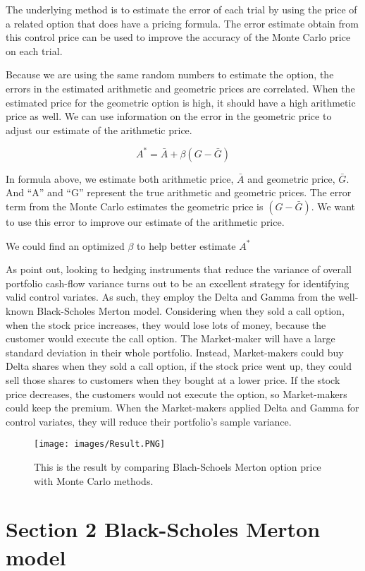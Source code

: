 \documentclass[11pt,]{article}
\makeatletter
\def\maxwidth{\ifdim\Gin@nat@width>\linewidth\linewidth
\else\Gin@nat@width\fi}
\let\Oldincludegraphics\includegraphics
\renewcommand{\includegraphics}[1]{\Oldincludegraphics[width=\maxwidth]{#1}}
\makeatother
\begin{document}
The underlying method is to estimate the error of each trial by using
the price of a related option that does have a pricing formula. The
error estimate obtain from this control price can be used to improve the
accuracy of the Monte Carlo price on each trial.

Because we are using the same random numbers to estimate the option, the
errors in the estimated arithmetic and geometric prices are correlated.
When the estimated price for the geometric option is high, it should
have a high arithmetic price as well. We can use information on the
error in the geometric price to adjust our estimate of the arithmetic
price.

\[
A^* = \bar A + \beta(G-\bar G)
\]

In formula above, we estimate both arithmetic price, \(\bar A\) and
geometric price, \(\bar G\). And ``A'' and ``G'' represent the true
arithmetic and geometric prices. The error term from the Monte Carlo
estimates the geometric price is \((G - \bar G)\). We want to use this
error to improve our estimate of the arithmetic price.

We could find an optimized \(\beta\) to help better estimate \(A^*\)

As \citet{ClewlowStrickland} point out, looking to hedging instruments
that reduce the variance of overall portfolio cash-flow variance turns
out to be an excellent strategy for identifying valid control variates.
As such, they employ the Delta and Gamma from the well-known
Black-Scholes Merton model. Considering when they sold a call option,
when the stock price increases, they would lose lots of money, because
the customer would execute the call option. The Market-maker will have a
large standard deviation in their whole portfolio. Instead,
Market-makers could buy Delta shares when they sold a call option, if
the stock price went up, they could sell those shares to customers when
they bought at a lower price. If the stock price decreases, the
customers would not execute the option, so Market-makers could keep the
premium. When the Market-makers applied Delta and Gamma for control
variates, they will reduce their portfolio's sample variance.

\begin{figure}
\centering
\texttt{[image: images/Result.PNG]}
\caption{This is the result by comparing Blach-Schoels Merton option
price with Monte Carlo methods.}
\end{figure}

\section{Section 2 Black-Scholes Merton
model}\label{section-2-black-scholes-merton-model}
\end{document}
